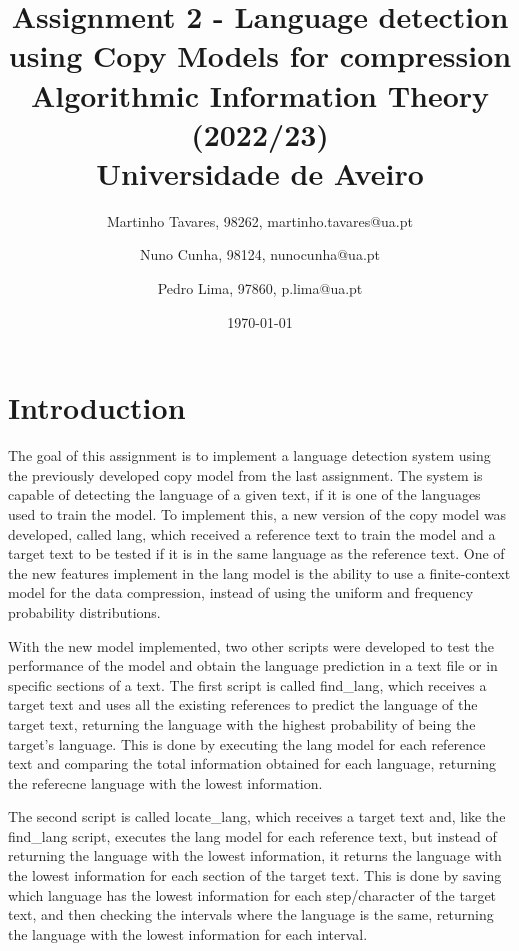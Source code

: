 \documentclass{article}
\begin{document}
\title{
    Assignment 2 - Language detection using Copy Models for compression \\
    \large{Algorithmic Information Theory (2022/23) \\
    Universidade de Aveiro}
}

\author{
    Martinho Tavares, 98262, martinho.tavares@ua.pt \and
    Nuno Cunha, 98124, nunocunha@ua.pt \and
    Pedro Lima, 97860, p.lima@ua.pt
}

\date{\today}
\maketitle

\section{Introduction}
\label{sec:introduction}

The goal of this assignment is to implement a language detection system using the previously developed copy model from the last assignment.
The system is capable of detecting the language of a given text, if it is one of the languages used to train the model.
To implement this, a new version of the copy model was developed, called lang, which received a reference text to train the model and a target text to be tested if it is in the same language as the reference text.
One of the new features implement in the lang model is the ability to use a finite-context model for the data compression, instead of using the uniform and frequency probability distributions.

With the new model implemented, two other scripts were developed to test the performance of the model and obtain the language prediction in a text file or in specific sections of a text.
The first script is called find_lang, which receives a target text and uses all the existing references to predict the language of the target text, returning the language with the highest probability of being the target's language.
This is done by executing the lang model for each reference text and comparing the total information obtained for each language, returning the referecne language with the lowest information.

The second script is called locate_lang, which receives a target text and, like the find_lang script, executes the lang model for each reference text, but instead of returning the language with the lowest information, it returns the language with the lowest information for each section of the target text.
This is done by saving which language has the lowest information for each step/character of the target text, and then checking the intervals where the language is the same, returning the language with the lowest information for each interval.
\end{document}
